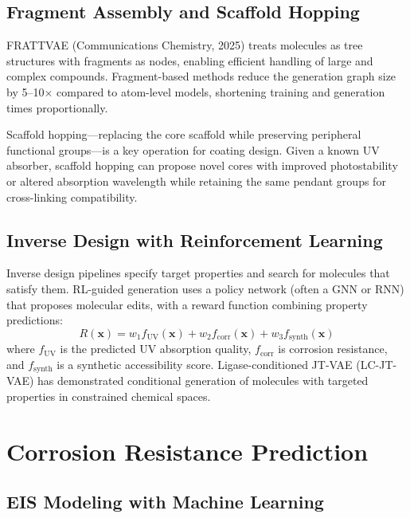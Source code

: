 \documentclass[11pt,a4paper]{article}
\begin{document}
\subsection{Fragment Assembly and Scaffold Hopping}

FRATTVAE (Communications Chemistry, 2025) treats molecules as tree structures with fragments as nodes, enabling efficient handling of large and complex compounds.
Fragment-based methods reduce the generation graph size by 5--10$\times$ compared to atom-level models, shortening training and generation times proportionally.

Scaffold hopping---replacing the core scaffold while preserving peripheral functional groups---is a key operation for coating design.
Given a known UV absorber, scaffold hopping can propose novel cores with improved photostability or altered absorption wavelength while retaining the same pendant groups for cross-linking compatibility.

\subsection{Inverse Design with Reinforcement Learning}

Inverse design pipelines specify target properties and search for molecules that satisfy them.
RL-guided generation uses a policy network (often a GNN or RNN) that proposes molecular edits, with a reward function combining property predictions:
\begin{equation}
R(\mathbf{x}) = w_1 f_\text{UV}(\mathbf{x}) + w_2 f_\text{corr}(\mathbf{x}) + w_3 f_\text{synth}(\mathbf{x})
\end{equation}
where $f_\text{UV}$ is the predicted UV absorption quality, $f_\text{corr}$ is corrosion resistance, and $f_\text{synth}$ is a synthetic accessibility score.
Ligase-conditioned JT-VAE (LC-JT-VAE) has demonstrated conditional generation of molecules with targeted properties in constrained chemical spaces.

\section{Corrosion Resistance Prediction}
\label{sec:corrosion}

\subsection{EIS Modeling with Machine Learning}
\end{document}
